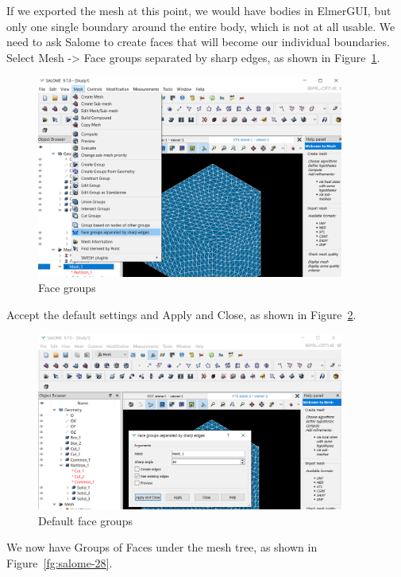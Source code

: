 If we exported the mesh at this point, we would have bodies in ElmerGUI, but only one single boundary around the entire body, which is not at all usable.  We need to ask Salome to create faces that will become our individual boundaries.  Select Mesh -> Face groups separated by sharp edges, as shown in Figure~\ref{fg:salome-26}.

\begin{figure}[H]
\centering
\includegraphics[width=0.9\textwidth]{Salome-26}
\caption{Face groups}\label{fg:salome-26}
\end{figure}

Accept the default settings and Apply and Close, as shown in Figure~\ref{fg:salome-27}.

\begin{figure}[H]
\centering
\includegraphics[width=0.9\textwidth]{Salome-27}
\caption{Default face groups}\label{fg:salome-27}
\end{figure}

We now have Groups of Faces under the mesh tree, as shown in Figure~\ref{fg:salome-28}.

